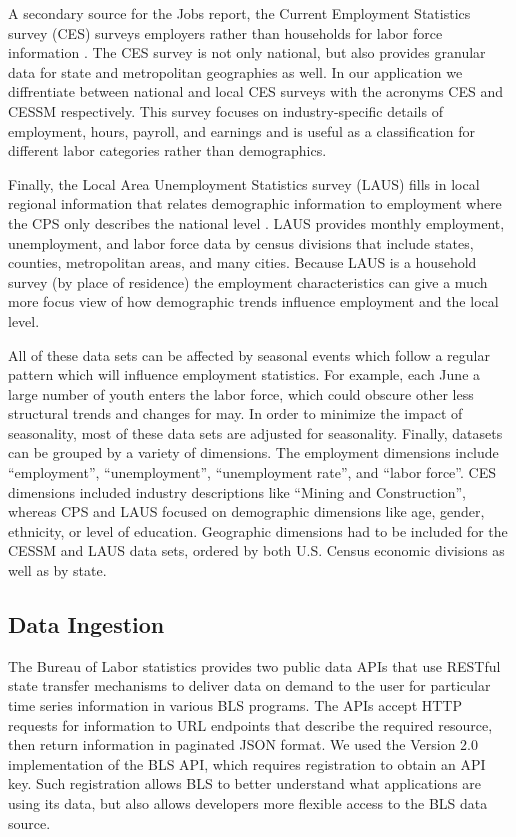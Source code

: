 \documentclass{sigchi}
\begin{document}
A secondary source for the Jobs report, the Current Employment Statistics survey (CES) surveys employers rather than households for labor force information \cite{_current_2015}. The CES survey is not only national, but also provides granular data for state and metropolitan geographies as well. In our application we diffrentiate between national and local CES surveys with the acronyms CES and CESSM respectively. This survey focuses on industry-specific details of employment, hours, payroll, and earnings and is useful as a classification for different labor categories rather than demographics.

Finally, the Local Area Unemployment Statistics survey (LAUS) fills in local regional information that relates demographic information to employment where the CPS only describes the national level \cite{_local_2015}. LAUS provides monthly employment, unemployment, and labor force data by census divisions that include states, counties, metropolitan areas, and many cities. Because LAUS is a household survey (by place of residence) the employment characteristics can give a much more focus view of how demographic trends influence employment and the local level.

All of these data sets can be affected by seasonal events which follow a regular pattern which will influence employment statistics. For example, each June a large number of youth enters the labor force, which could obscure other less structural trends and changes for may. In order to minimize the impact of seasonality, most of these data sets are adjusted for seasonality. Finally, datasets can be grouped by a variety of dimensions. The employment dimensions include ``employment'', ``unemployment'', ``unemployment rate'', and ``labor force''. CES dimensions included industry descriptions like ``Mining and Construction'', whereas CPS and LAUS focused on demographic dimensions like age, gender, ethnicity, or level of education. Geographic dimensions had to be included for the CESSM and LAUS data sets, ordered by both U.S. Census economic divisions as well as by state.

\subsection{Data Ingestion}

The Bureau of Labor statistics provides two public data APIs that use RESTful state transfer mechanisms to deliver data on demand to the user for particular time series information in various BLS programs. The APIs accept HTTP requests for information to URL endpoints that describe the required resource, then return information in paginated JSON format. We used the Version 2.0 implementation of the BLS API, which requires registration to obtain an API key. Such registration allows BLS to better understand what applications are using its data, but also allows developers more flexible access to the BLS data source.
\end{document}
